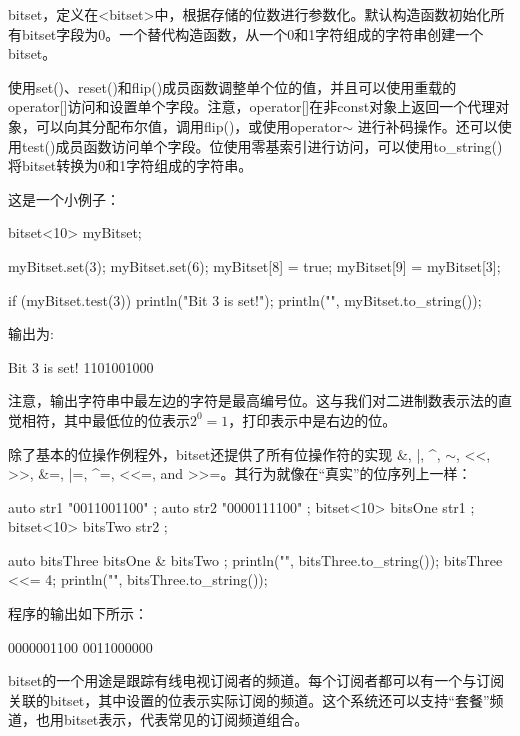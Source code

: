 
bitset，定义在<bitset>中，根据存储的位数进行参数化。默认构造函数初始化所有bitset字段为0。一个替代构造函数，从一个0和1字符组成的字符串创建一个bitset。

使用set()、reset()和flip()成员函数调整单个位的值，并且可以使用重载的operator[]访问和设置单个字段。注意，operator[]在非const对象上返回一个代理对象，可以向其分配布尔值，调用flip()，或使用operator$\sim$ 进行补码操作。还可以使用test()成员函数访问单个字段。位使用零基索引进行访问，可以使用to\_string()将bitset转换为0和1字符组成的字符串。

这是一个小例子：

\begin{cpp}
bitset<10> myBitset;

myBitset.set(3);
myBitset.set(6);
myBitset[8] = true;
myBitset[9] = myBitset[3];

if (myBitset.test(3)) { println("Bit 3 is set!"); }
println("{}", myBitset.to_string());
\end{cpp}

输出为:

\begin{shell}
Bit 3 is set!
1101001000
\end{shell}

注意，输出字符串中最左边的字符是最高编号位。这与我们对二进制数表示法的直觉相符，其中最低位的位表示$2^0 = 1$，打印表示中是右边的位。


除了基本的位操作例程外，bitset还提供了所有位操作符的实现 \&, |, \^{}, $\sim$, <{}<, >{}>, \&=, |=, \^{}=, <{}<=, and >{}>=。其行为就像在“真实”的位序列上一样：

\begin{cpp}
auto str1 { "0011001100" };
auto str2 { "0000111100" };
bitset<10> bitsOne { str1 };
bitset<10> bitsTwo { str2 };

auto bitsThree { bitsOne & bitsTwo };
println("{}", bitsThree.to_string());
bitsThree <<= 4;
println("{}", bitsThree.to_string());
\end{cpp}

程序的输出如下所示：

\begin{shell}
0000001100
0011000000
\end{shell}


bitset的一个用途是跟踪有线电视订阅者的频道。每个订阅者都可以有一个与订阅关联的bitset，其中设置的位表示实际订阅的频道。这个系统还可以支持“套餐”频道，也用bitset表示，代表常见的订阅频道组合。

